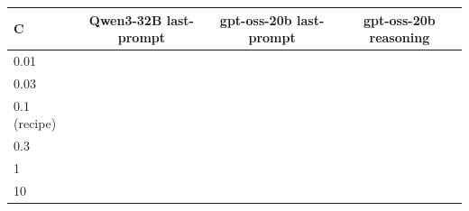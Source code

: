 \begin{tabular}{@{}lccc@{}}
\toprule
C & Qwen3-32B last-prompt & gpt-oss-20b last-prompt & gpt-oss-20b reasoning \\
\midrule
0.01 & \eEighteenCHundredthQwenProbe{} \eEighteenCHundredthQwenProbeCI{} & \eEighteenCHundredthGptProbe{} \eEighteenCHundredthGptProbeCI{} & \eEighteenCHundredthGptReasoning{} \eEighteenCHundredthGptReasoningCI{} \\
0.03 & \eEighteenCThreeHundredthsQwenProbe{} \eEighteenCThreeHundredthsQwenProbeCI{} & \eEighteenCThreeHundredthsGptProbe{} \eEighteenCThreeHundredthsGptProbeCI{} & \eEighteenCThreeHundredthsGptReasoning{} \eEighteenCThreeHundredthsGptReasoningCI{} \\
0.1 (recipe) & \eEighteenCTenthQwenProbe{} \eEighteenCTenthQwenProbeCI{} & \eEighteenCTenthGptProbe{} \eEighteenCTenthGptProbeCI{} & \eEighteenCTenthGptReasoning{} \eEighteenCTenthGptReasoningCI{} \\
0.3 & \eEighteenCThreeTenthsQwenProbe{} \eEighteenCThreeTenthsQwenProbeCI{} & \eEighteenCThreeTenthsGptProbe{} \eEighteenCThreeTenthsGptProbeCI{} & \eEighteenCThreeTenthsGptReasoning{} \eEighteenCThreeTenthsGptReasoningCI{} \\
1 & \eEighteenCOneQwenProbe{} \eEighteenCOneQwenProbeCI{} & \eEighteenCOneGptProbe{} \eEighteenCOneGptProbeCI{} & \eEighteenCOneGptReasoning{} \eEighteenCOneGptReasoningCI{} \\
10 & \eEighteenCTenQwenProbe{} \eEighteenCTenQwenProbeCI{} & \eEighteenCTenGptProbe{} \eEighteenCTenGptProbeCI{} & \eEighteenCTenGptReasoning{} \eEighteenCTenGptReasoningCI{} \\
\bottomrule
\end{tabular}
